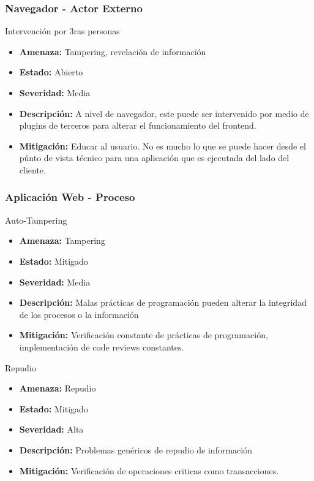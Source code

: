 \subsubsection{Navegador - Actor Externo}
Intervención por 3ras personas
\begin{itemize}
    \item \textbf{Amenaza: } Tampering, revelación de información
    \item \textbf{Estado: } Abierto
    \item \textbf{Severidad: } Media
    \item \textbf{Descripción: } A nivel de navegador, este puede ser intervenido por medio de plugins de terceros para alterar el funcionamiento del frontend.
    \item \textbf{Mitigación: } Educar al usuario. No es mucho lo que se puede hacer desde el púnto de vista técnico para una aplicación que es ejecutada del lado del cliente.
\end{itemize}

\subsubsection{Aplicación Web - Proceso}
Auto-Tampering
\begin{itemize}
    \item \textbf{Amenaza: } Tampering
    \item \textbf{Estado: } Mitigado
    \item \textbf{Severidad: } Media
    \item \textbf{Descripción: } Malas prácticas de programación pueden alterar la integridad de los procesos o la información
    \item \textbf{Mitigación: } Verificación constante de prácticas de programación, implementación de code reviews constantes.
\end{itemize}

Repudio
\begin{itemize}
    \item \textbf{Amenaza: } Repudio
    \item \textbf{Estado: } Mitigado
    \item \textbf{Severidad: } Alta
    \item \textbf{Descripción: } Problemas genéricos de repudio de información
    \item \textbf{Mitigación: } Verificación de operaciones criticas como transacciones.
\end{itemize}


